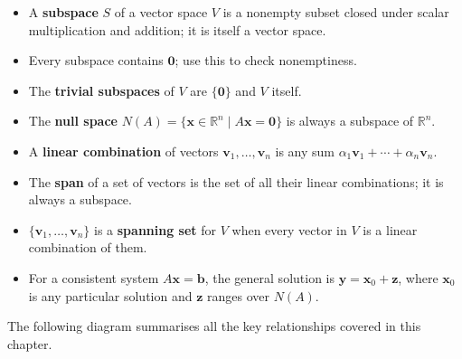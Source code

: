 \documentclass[12pt,a4paper]{article}
\newcommand{\R}{\mathbb{R}}
\newcommand{\vv}[1]{\mathbf{#1}}
\newcommand{\vzero}{\mathbf{0}}
\begin{document}
\begin{tcolorbox}[
  enhanced, colback=shadeyellow, colframe=orange!70!black,
  title={\bfseries Chapter Summary}, breakable
]
\begin{itemize}[leftmargin=1.5em, itemsep=0.5em]
  \item A \textbf{subspace} $S$ of a vector space $V$ is a nonempty subset closed
        under scalar multiplication and addition; it is itself a vector space.
  \item Every subspace contains $\vzero$; use this to check nonemptiness.
  \item The \textbf{trivial subspaces} of $V$ are $\{\vzero\}$ and $V$ itself.
  \item The \textbf{null space} $N(A) = \{\vv{x}\in\R^n \mid A\vv{x}=\vzero\}$ is
        always a subspace of $\R^n$.
  \item A \textbf{linear combination} of vectors $\vv{v}_1,\ldots,\vv{v}_n$ is any
        sum $\alpha_1\vv{v}_1+\cdots+\alpha_n\vv{v}_n$.
  \item The \textbf{span} of a set of vectors is the set of all their linear
        combinations; it is always a subspace.
  \item $\{\vv{v}_1,\ldots,\vv{v}_n\}$ is a \textbf{spanning set} for $V$ when
        every vector in $V$ is a linear combination of them.
  \item For a consistent system $A\vv{x}=\vv{b}$, the general solution is
        $\vv{y} = \vv{x}_0 + \vv{z}$, where $\vv{x}_0$ is any particular
        solution and $\vv{z}$ ranges over $N(A)$.
\end{itemize}
\end{tcolorbox}

\medskip
\noindent
The following diagram summarises all the key relationships covered in this chapter.
\end{document}
